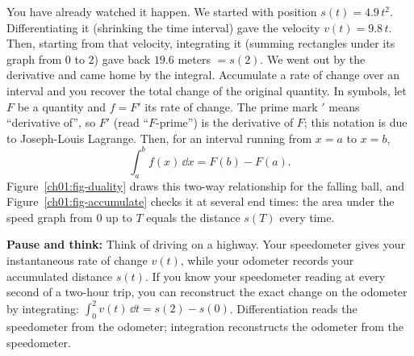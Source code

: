 You have already watched it happen. We started with position $s(t) = 4.9\,t^2$.
Differentiating it (shrinking the time interval) gave the velocity
$v(t) = 9.8\,t$. Then, starting from that velocity, integrating it (summing
rectangles under its graph from $0$ to $2$) gave back $19.6$ meters $= s(2)$. We
went out by the derivative and came home by the integral. Accumulate a rate of
change over an interval and you recover the total change of the original
quantity. In symbols, let $F$ be a quantity and $f = F'$ its rate of change.
The prime mark $'$ means ``derivative of'', so $F'$ (read ``$F$-prime'') is the
derivative of $F$; this notation is due to Joseph-Louis Lagrange. Then, for an
interval running from $x=a$ to $x=b$,
\[
  \int_a^b f(x)\,\dd x = F(b) - F(a).
\]
Figure~\ref{ch01:fig-duality} draws this two-way relationship for the falling ball,
and Figure~\ref{ch01:fig-accumulate} checks it at several end times: the area under
the speed graph from $0$ up to $T$ equals the distance $s(T)$ every time.

\begin{recoverybox}
\textbf{Pause and think:} Think of driving on a highway. Your speedometer gives your
instantaneous rate of change $v(t)$, while your odometer records your accumulated
distance $s(t)$. If you know your speedometer reading at every second of a two-hour
trip, you can reconstruct the exact change on the odometer by integrating:
$\int_0^2 v(t)\,\dd t = s(2) - s(0)$. Differentiation reads the speedometer from
the odometer; integration reconstructs the odometer from the speedometer.
\end{recoverybox}

